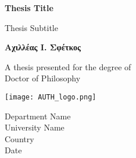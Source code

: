 \begin{titlepage}
   \begin{center}
       \vspace*{1cm}

       \textbf{Thesis Title}

       \vspace{0.5cm}
        Thesis Subtitle
            
       \vspace{1.5cm}

       \textbf{Αχιλλέας Ι. Σφέτκος}

       \vfill
            
       A thesis presented for the degree of\\
       Doctor of Philosophy
            
       \vspace{0.8cm}
     
       \texttt{[image: AUTH\_logo.png]}
            
       Department Name\\
       University Name\\
       Country\\
       Date
            
   \end{center}
\end{titlepage}